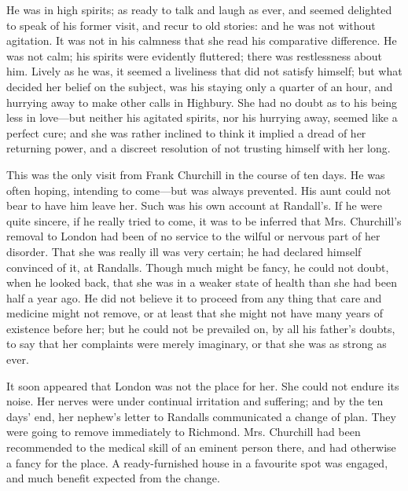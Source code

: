 He was in high spirits; as ready to talk and laugh as ever, and seemed delighted to speak of his former visit, and recur to old stories: and he was not without agitation. It was not in his calmness that she read his comparative difference. He was not calm; his spirits were evidently fluttered; there was restlessness about him. Lively as he was, it seemed a liveliness that did not satisfy himself; but what decided her belief on the subject, was his staying only a quarter of an hour, and hurrying away to make other calls in Highbury.  She had no doubt as to his being less in love---but neither his agitated spirits, nor his hurrying away, seemed like a perfect cure; and she was rather inclined to think it implied a dread of her returning power, and a discreet resolution of not trusting himself with her long.

This was the only visit from Frank Churchill in the course of ten days. He was often hoping, intending to come---but was always prevented. His aunt could not bear to have him leave her. Such was his own account at Randall's. If he were quite sincere, if he really tried to come, it was to be inferred that Mrs. Churchill's removal to London had been of no service to the wilful or nervous part of her disorder. That she was really ill was very certain; he had declared himself convinced of it, at Randalls. Though much might be fancy, he could not doubt, when he looked back, that she was in a weaker state of health than she had been half a year ago. He did not believe it to proceed from any thing that care and medicine might not remove, or at least that she might not have many years of existence before her; but he could not be prevailed on, by all his father's doubts, to say that her complaints were merely imaginary, or that she was as strong as ever.

It soon appeared that London was not the place for her. She could not endure its noise. Her nerves were under continual irritation and suffering; and by the ten days' end, her nephew's letter to Randalls communicated a change of plan. They were going to remove immediately to Richmond. Mrs. Churchill had been recommended to the medical skill of an eminent person there, and had otherwise a fancy for the place. A ready-furnished house in a favourite spot was engaged, and much benefit expected from the change.

